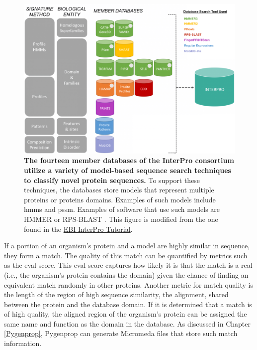 \begin{figure}[!ht]
  \centering
	\includegraphics[width=\textwidth]{media/InterPro.png}
	 \caption[The fourteen member databases of the InterPro consortium utilize a variety of model-based sequence search techniques to classify novel protein sequences.]{\textbf{The fourteen member databases of the InterPro consortium utilize a variety of model-based sequence search techniques to classify novel protein sequences.} To support these techniques, the databases store models that represent multiple proteins or proteins domains. Examples of such models include \gls{hmm}s and \gls{pssm}. Examples of software that use such models are HMMER \cite{eddy2011accelerated} or RPS-BLAST \cite{mcginnis2004blast}. This figure is modified from the one found in the \href{https://www.ebi.ac.uk/training/online/course/introduction-protein-classification-ebi/protein-classification-resources-ebi-interpro}{EBI InterPro Tutorial}.}
	 \label{fig:interpro-databases}
\end{figure}

If a portion of an organism's protein and a model are highly similar in sequence, they form a match. The quality of this match can be quantified by metrics such as the \gls{eval} score. This \gls{eval} score captures how likely it is that the match is a real (i.e., the organism's protein contains the domain) given the chance of finding an equivalent match randomly in other proteins. Another metric for match quality is the length of the region of high sequence similarity, the alignment, shared between the protein and the database domain. If it is determined that a match is of high quality, the aligned region of the organism's protein can be assigned the same name and function as the domain in the database.  As discussed in Chapter \ref{Pygenprop}, Pygenprop can generate Micromeda files that store such match information.


